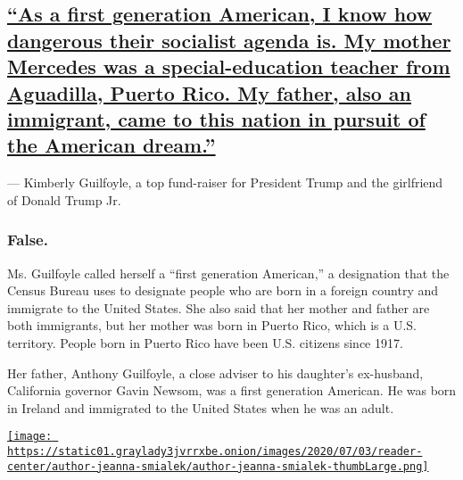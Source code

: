 \hypertarget{as-a-first-generation-american-i-know-how-dangerous-their-socialist-agenda-is-my-mother-mercedes-was-a-special-education-teacher-from-aguadilla-puerto-rico-my-father-also-an-immigrant-came-to-this-nation-in-pursuit-of-the-american-dream}{%
\subsection{\texorpdfstring{\protect\hyperlink{as-a-first-generation-american-i-know-how-dangerous-their-socialist-agenda-is-my-mother-mercedes-was-a-special-education-teacher}{``As
a first generation American, I know how dangerous their socialist agenda
is. My mother Mercedes was a special-education teacher from Aguadilla,
Puerto Rico. My father, also an immigrant, came to this nation in
pursuit of the American
dream.''}}{``As a first generation American, I know how dangerous their socialist agenda is. My mother Mercedes was a special-education teacher from Aguadilla, Puerto Rico. My father, also an immigrant, came to this nation in pursuit of the American dream.''}}\label{as-a-first-generation-american-i-know-how-dangerous-their-socialist-agenda-is-my-mother-mercedes-was-a-special-education-teacher-from-aguadilla-puerto-rico-my-father-also-an-immigrant-came-to-this-nation-in-pursuit-of-the-american-dream}}

--- Kimberly Guilfoyle, a top fund-raiser for President Trump and the
girlfriend of Donald Trump Jr.

\hypertarget{false-}{%
\subsubsection{False. }\label{false-}}

Ms. Guilfoyle called herself a ``first generation American,'' a
designation that the Census Bureau uses to designate people who are born
in a foreign country and immigrate to the United States. She also said
that her mother and father are both immigrants, but her mother was born
in Puerto Rico, which is a U.S. territory. People born in Puerto Rico
have been U.S. citizens since 1917.

Her father, Anthony Guilfoyle, a close adviser to his daughter's
ex-husband, California governor Gavin Newsom, was a first generation
American. He was born in Ireland and immigrated to the United States
when he was an adult.

\href{https://www.nytimes3xbfgragh.onion/by/jeanna-smialek}{\texttt{[image: https://static01.graylady3jvrrxbe.onion/images/2020/07/03/reader-center/author-jeanna-smialek/author-jeanna-smialek-thumbLarge.png]}}

